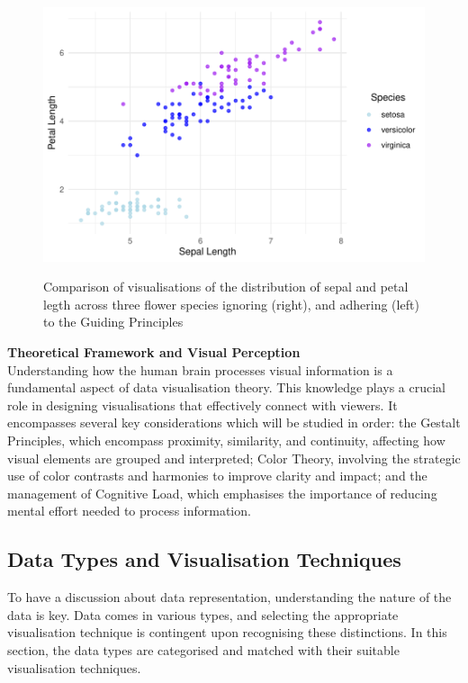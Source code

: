 \documentclass{article}\usepackage[]{graphicx}\usepackage[]{xcolor}
\newenvironment{knitrout}{}{} %
\begin{document}
\begin{figure}[htbp]
\begin{minipage}[b]{0.45\linewidth}
\begin{knitrout}
{\centering \includegraphics[width=\linewidth]{figure/beamer-cleargraph1-1} 

}


\end{knitrout}
    \label{fig:cleargraph1}
  \end{minipage}
\caption{Comparison of visualisations of the distribution of sepal and petal legth across three flower species ignoring (right), and adhering (left) to the Guiding Principles}
\end{figure}


\noindent \textbf{Theoretical Framework and Visual Perception}\\
Understanding how the human brain processes visual information is a fundamental aspect of data visualisation theory. This knowledge plays a crucial role in designing visualisations that effectively connect with viewers. It encompasses several key considerations which will be studied in order: the Gestalt Principles, which encompass proximity, similarity, and continuity, affecting how visual elements are grouped and interpreted; Color Theory, involving the strategic use of color contrasts and harmonies to improve clarity and impact; and the management of Cognitive Load, which emphasises the importance of reducing mental effort needed to process information.\\


\subsection{Data Types and Visualisation Techniques}
To have a discussion about data representation, understanding the nature of the data is key. Data comes in various types, and selecting the appropriate visualisation technique is contingent upon recognising these distinctions. In this section, the data types are categorised and matched with their suitable visualisation techniques.
\end{document}
